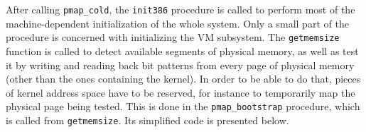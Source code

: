 \documentclass[shortabstract, english]{iithesis}
\begin{document}
After calling \texttt{pmap_cold}, the \texttt{init386} procedure
is called to perform most of the machine-dependent initialization of the whole
system. Only a small part of the procedure is concerned with initializing the VM
subsystem. The \texttt{getmemsize} function is called to detect available
segments of physical memory, as well as test it by writing and reading back bit
patterns from every page of physical memory (other than the ones containing the
kernel). In order to be able to do that, pieces of kernel address space have to
be reserved, for instance to temporarily map the physical page being tested.
This is done in the \texttt{pmap_bootstrap} procedure, which is called
from \texttt{getmemsize}. Its simplified code is presented below.

\vspace{16pt}
\end{document}
